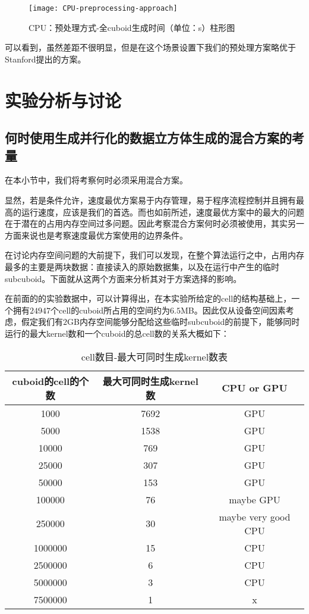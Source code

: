\begin{figure}[ht]
\centering
\texttt{[image: CPU-preprocessing-approach]}
\caption{CPU：预处理方式-全cuboid生成时间（单位：s）柱形图} 
\label{fig:figure8}
\end{figure}

可以看到，虽然差距不很明显，但是在这个场景设置下我们的预处理方案略优于Stanford提出的方案。

\section{实验分析与讨论}

\subsection{何时使用生成并行化的数据立方体生成的混合方案的考量}
在本小节中，我们将考察何时必须采用混合方案。

显然，若是条件允许，速度最优方案易于内存管理，易于程序流程控制并且拥有最高的运行速度，应该是我们的首选。而也如前所述，速度最优方案中的最大的问题在于潜在的占用内存空间过多问题。因此考察混合方案何时必须被使用，其实另一方面来说也是考察速度最优方案使用的边界条件。

在讨论内存空间问题的大前提下，我们可以发现，在整个算法运行之中，占用内存最多的主要是两块数据：直接读入的原始数据集，以及在运行中产生的临时subcuboid。下面就从这两个方面来分析其对于方案选择的影响。

在前面的的实验数据中，可以计算得出，在本实验所给定的cell的结构基础上，一个拥有$24947$个cell的cuboid所占用的空间约为$6.5$MB。因此仅从设备空间因素考虑，假定我们有$2$GB内存空间能够分配给这些临时subcuboid的前提下，能够同时运行的最大kernel数和一个cuboid的总cell数的关系大概如下：

\begin{table}[!htbp]
\centering
\caption{cell数目-最大可同时生成kernel数表} 
\label{tab:table19}
\begin{tabular}{|c|c|c|}
    \hline
    cuboid的cell的个数 & 最大可同时生成kernel数 & CPU or GPU\\
    \hline
    1000 & 7692 & GPU\\
    \hline
    5000 & 1538 & GPU\\
    \hline
    10000 & 769 & GPU\\
    \hline
    25000 & 307 & GPU\\
    \hline
    50000 & 153 & GPU\\
    \hline
    100000 & 76 & maybe GPU\\
    \hline
    250000 & 30 & maybe very good CPU\\
    \hline
    1000000 & 15 & CPU\\
    \hline
    2500000 & 6 & CPU\\
    \hline
    5000000 & 3 & CPU\\
    \hline
    7500000 & 1 & x\\
    \hline
\end{tabular}
\end{table}

